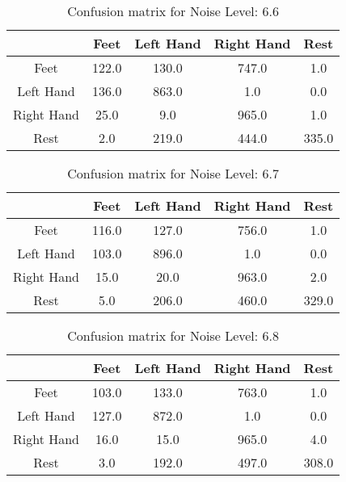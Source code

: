 \begin{table}[!htbp]
    \centering
    \begin{tabular}{|c||c|c|c|c|}
        \hline
		 & Feet & Left Hand & Right Hand & Rest \\
        \hline
        \hline
        Feet & 122.0 & 130.0 & 747.0 & 1.0 \\
        \hline
        Left Hand & 136.0 & 863.0 & 1.0 & 0.0 \\
        \hline
        Right Hand & 25.0 & 9.0 & 965.0 & 1.0 \\
        \hline
        Rest & 2.0 & 219.0 & 444.0 & 335.0 \\
        \hline
    \end{tabular}
    \caption{Confusion matrix for Noise Level: 6.6}
\end{table}

\begin{table}[!htbp]
    \centering
    \begin{tabular}{|c||c|c|c|c|}
        \hline
		 & Feet & Left Hand & Right Hand & Rest \\
        \hline
        \hline
        Feet & 116.0 & 127.0 & 756.0 & 1.0 \\
        \hline
        Left Hand & 103.0 & 896.0 & 1.0 & 0.0 \\
        \hline
        Right Hand & 15.0 & 20.0 & 963.0 & 2.0 \\
        \hline
        Rest & 5.0 & 206.0 & 460.0 & 329.0 \\
        \hline
    \end{tabular}
    \caption{Confusion matrix for Noise Level: 6.7}
\end{table}

\begin{table}[!htbp]
    \centering
    \begin{tabular}{|c||c|c|c|c|}
        \hline
		 & Feet & Left Hand & Right Hand & Rest \\
        \hline
        \hline
        Feet & 103.0 & 133.0 & 763.0 & 1.0 \\
        \hline
        Left Hand & 127.0 & 872.0 & 1.0 & 0.0 \\
        \hline
        Right Hand & 16.0 & 15.0 & 965.0 & 4.0 \\
        \hline
        Rest & 3.0 & 192.0 & 497.0 & 308.0 \\
        \hline
    \end{tabular}
    \caption{Confusion matrix for Noise Level: 6.8}
\end{table}

